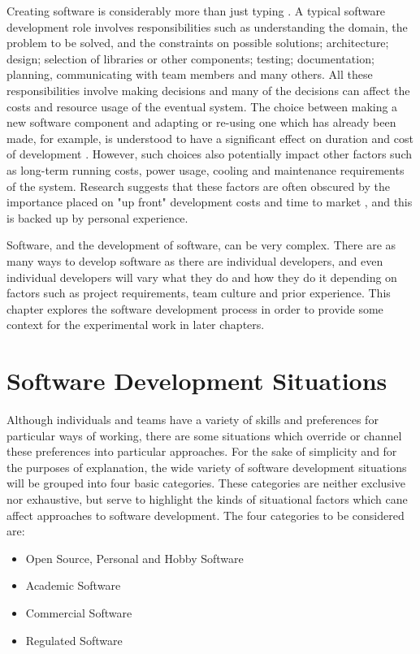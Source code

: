 Creating software is considerably more than just typing \citep{Brooks1995}. A typical software development role involves responsibilities such as understanding the domain, the problem to be solved, and the constraints on possible solutions; architecture; design; selection of libraries or other components; testing; documentation; planning, communicating with team members and many others. All these responsibilities involve making decisions and many of the decisions can affect the costs and resource usage of the eventual system. The choice between making a new software component and adapting or re-using one which has already been made, for example, is understood to have a significant effect on duration and cost of development \citep{Gacek2002}. However, such choices also potentially impact other factors such as long-term running costs, power usage, cooling and maintenance requirements of the system. Research suggests that these factors are often obscured by the importance placed on "up front" development costs and time to market \citep{Petro2017}, and this is backed up by personal experience.

Software, and the development of software, can be very complex. There are as many ways to develop software as there are individual developers, and even individual developers will vary what they do and how they do it depending on factors such as project requirements, team culture and prior experience. This chapter explores the software development process in order to provide some context for the experimental work in later chapters.

\section{Software Development Situations}
\label{section:software development situations}

Although individuals and teams have a variety of skills and preferences for particular ways of working, there are some situations which override or channel these preferences into particular approaches. For the sake of simplicity and for the purposes of explanation, the wide variety of software development situations will be grouped into four basic categories. These categories are neither exclusive nor exhaustive, but serve to highlight the kinds of situational factors which cane affect approaches to software development. The four categories to be considered are:

\begin{itemize}
    \item Open Source, Personal and Hobby Software
    \item Academic Software
    \item Commercial Software
    \item Regulated Software
\end{itemize}

